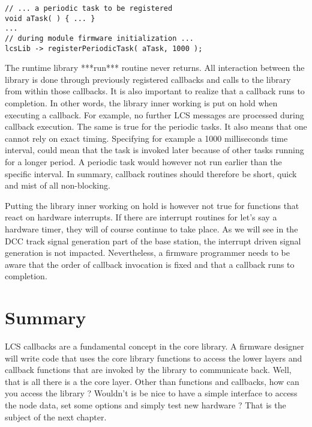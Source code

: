 \lstset{style=codesnippetstyle}
\begin{lstlisting}
// ... a periodic task to be registered
void aTask( ) { ... }
...
// during module firmware initialization ...
lcsLib -> registerPeriodicTask( aTask, 1000 );
\end{lstlisting}

The runtime library ***run*** routine never returns. All interaction between the library is done through previously registered callbacks and calls to the library from within those callbacks. It is also important to realize that a callback runs to completion. In other words, the library inner working is put on hold when executing a callback. For example, no further LCS messages are processed during callback execution. The same is true for the periodic tasks. It also means that one cannot rely on exact timing. Specifying for example a 1000 milliseconds time interval, could mean that the task is invoked later because of other tasks running for a longer period. A periodic task would however not run earlier than the specific interval. In summary, callback routines should therefore be short, quick and mist of all non-blocking.

Putting the library inner working on hold is however not true for functions that react on hardware interrupts. If there are interrupt routines for let's say a hardware timer, they will of course continue to take place. As we will see in the DCC track signal generation part of the base station, the interrupt driven signal generation is not impacted. Nevertheless, a firmware programmer needs to be aware that the order of callback invocation is fixed and that a callback runs to completion.

\section{Summary}

LCS callbacks are a fundamental concept in the core library. A firmware designer will write code that uses the core library functions to access the lower layers and callback functions that are invoked by the library to communicate back. Well, that is all there is a the core layer. Other than functions and callbacks, how can you access the library ? Wouldn't is be nice to have a simple interface to access the node data, set some options and simply test new hardware ? That is the subject of the next chapter.


